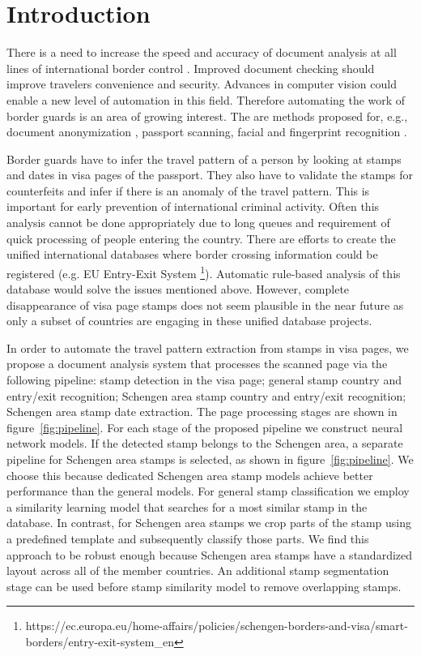 \documentclass[twocolumn]{svjour3}
\begin{document}
\section{Introduction}
\label{intro}

There is a need to increase the speed and accuracy of document analysis at all lines of international border control \cite{kulju2018framework}. Improved document checking should improve travelers convenience and security. Advances in computer vision could enable a new level of automation in this field.
%
Therefore automating the work of border guards is an area of growing interest. The are methods proposed for, e.g., document anonymization , passport scanning, facial and fingerprint recognition \cite{oostveen_automated_2014, gorodnichy_art_2015}.

Border guards have to infer the travel pattern of a person by looking at stamps and dates in visa pages of the passport. They also have to validate the stamps for counterfeits and infer if there is an anomaly of the travel pattern. This is important for early prevention of international criminal activity. Often this analysis cannot be done appropriately due to long queues and requirement of quick processing of people entering the country. There are efforts to create the unified international databases where border crossing information could be registered (e.g. EU Entry-Exit System
\footnote{https://ec.europa.eu/home-affairs/policies/schengen-borders-and-visa/smart-borders/entry-exit-system\_en}). Automatic rule-based analysis of this database would solve the issues mentioned above. However, complete disappearance of visa page stamps does not seem plausible in the near future as only a subset of countries are engaging in these unified database projects.

In order to automate the travel pattern extraction from stamps in visa pages, we propose a document analysis system that processes the scanned page via the following pipeline:
stamp detection in the visa page;
general stamp country and entry/exit recognition;
Schengen area stamp country and entry/exit recognition;
Schengen area stamp date extraction.
The page processing stages are shown in figure~\ref{fig:pipeline}.
For each stage of the proposed pipeline we construct neural network models.
If the detected stamp belongs to the Schengen area, a separate pipeline for Schengen area stamps is selected, as shown in figure~\ref{fig:pipeline}. We choose this because dedicated Schengen area stamp models achieve better performance than the general models. For general stamp classification we employ a similarity learning model that searches for a most similar stamp in the database. In contrast, for Schengen area stamps we crop parts of the stamp using a predefined template and subsequently classify those parts. We find this approach to be robust enough because Schengen area stamps have a standardized layout across all of the member countries. An additional stamp segmentation stage can be used before stamp similarity model to remove overlapping stamps.
\end{document}

